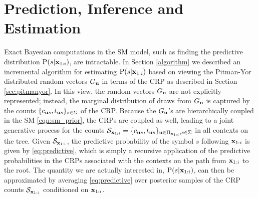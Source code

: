 \section{Prediction, Inference and Estimation}
\label{sec:inference}

Exact Bayesian computations in the SM model, such as finding the predictive
distribution $\Prob(s|\xbf_{1:i})$, are intractable.  In Section \ref{algorithm} we described an incremental algorithm for estimating $\Prob(s|\xbf_{1:i})$ based on viewing the Pitman-Yor distributed random vectors $G_\ubf$ in terms of the CRP as described in Section \ref{sec:pitmanyor}.
%  
In this view, the random vectors $G_{\ubf}$ are
not explicitly represented; instead, the marginal distribution of draws from
$G_{\ubf}$ is captured by the counts $\{c_{\ubf s},t_{\ubf s}\}_{s\in\Sigma}$ of the CRP. Because the $G_{\ubf}$'s are hierarchically coupled in the SM \eqref{eqn:sm_prior}, the CRPs are coupled as well, leading to a joint
generative process for the counts $\statei=\{c_{\ubf s},t_{\ubf s}\}_{\ubf\in\Pi_{\xbf_{1:i}},s\in\Sigma}$ in all contexts on the tree.  %
Given $\statei$, the predictive probability of the symbol $s$ following $\xbf_{1:i}$ is given by \eqref{eq:predictive}, which is simply a recursive application of the predictive probabilities in the CRPs associated with the contexts on the path from $\xbf_{1:i}$ to the root.  The quantity we are actually interested in, $\Prob(s|\xbf_{1:i})$, can then be approximated by averaging \eqref{eq:predictive} over posterior samples of the CRP counts $\statei$ conditioned on $\xbf_{1:i}$.  



